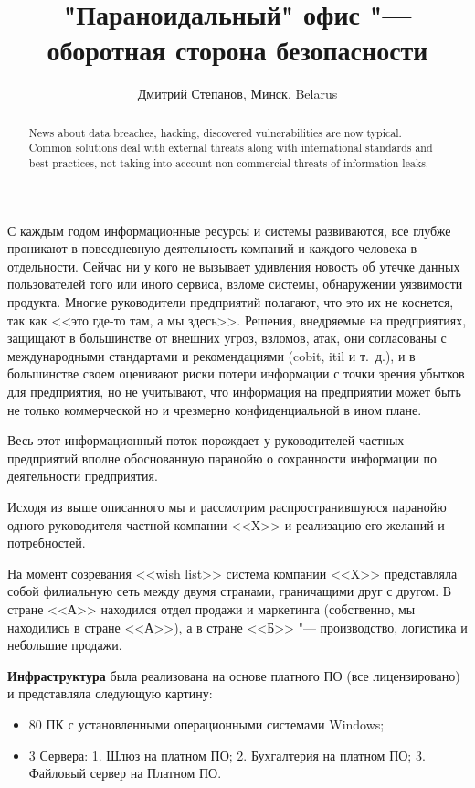 \documentclass[10pt, a5paper]{article}
\begin{document}
\title{"Параноидальный" офис "---  оборотная сторона безопасности}
\author{Дмитрий Степанов, Минск, Belarus}
\maketitle
\begin{abstract}
News about data breaches, hacking, discovered vulnerabilities are now typical. Common solutions deal with external threats along with international standards and best practices, not taking into account non-commercial threats of information leaks.
\end{abstract}
С каждым годом информационные ресурсы и системы развиваются, все глубже проникают в повседневную деятельность компаний и каждого человека в отдельности. Сейчас ни у кого не вызывает удивления новость об утечке данных пользователей того или иного сервиса, взломе системы, обнаружении уязвимости продукта. Многие руководители предприятий полагают, что это их не коснется, так как <<это где-то там, а мы здесь>>. Решения, внедряемые на предприятиях, защищают в большинстве от внешних угроз, взломов, атак, они согласованы с международными стандартами и рекомендациями (cobit, itil и т. д.), и в большинстве своем оценивают риски потери информации с точки зрения  убытков для предприятия, но не учитывают, что информация на предприятии может быть не только коммерческой но и чрезмерно конфиденциальной в ином плане.

Весь этот информационный поток порождает у руководителей частных предприятий вполне обоснованную паранойю о сохранности информации по деятельности предприятия.

Исходя из выше описанного мы и рассмотрим распространившуюся паранойю одного руководителя частной компании <<X>>  и реализацию его желаний и потребностей.

На момент созревания <<wish list>> система компании <<X>> представляла собой филиальную сеть между двумя странами, граничащими друг с другом. В стране <<А>> находился отдел продажи и маркетинга (собственно, мы находились в стране <<А>>), а в стране <<Б>> "--- производство, логистика и небольшие продажи.

\textbf{Инфраструктура} была реализована на основе платного ПО (все лицензировано) и представляла следующую картину:

\begin{itemize}
  \item 80 ПК с установленными операционными системами Windows;
  \item 3 Сервера: 1. Шлюз на платном ПО; 2. Бухгалтерия на платном ПО; 3. Файловый сервер на Платном ПО.
\end{itemize}
\end{document}
